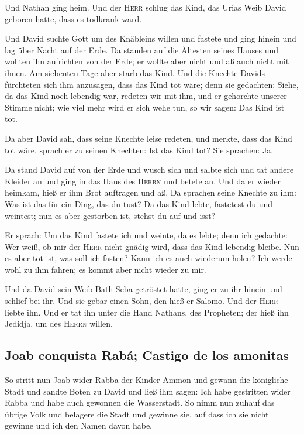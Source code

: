  Und Nathan ging heim. Und der \textsc{Herr} schlug das
Kind, das Urias Weib David geboren hatte, dass es todkrank ward.

 Und David suchte Gott um des Knäbleins willen und
fastete und ging hinein und lag über Nacht auf der Erde. 
Da standen auf die Ältesten seines Hauses und wollten ihn aufrichten von
der Erde; er wollte aber nicht und aß auch nicht mit ihnen.
 Am siebenten Tage aber starb das Kind. Und die Knechte
Davids fürchteten sich ihm anzusagen, dass das Kind tot wäre; denn sie
gedachten: Siehe, da das Kind noch lebendig war, redeten wir mit ihm,
und er gehorchte unserer Stimme nicht; wie viel mehr wird er sich wehe
tun, so wir sagen: Das Kind ist tot.

 Da aber David sah, dass seine Knechte leise redeten, und
merkte, dass das Kind tot wäre, sprach er zu seinen Knechten: Ist das
Kind tot? Sie sprachen: Ja.

 Da stand David auf von der Erde und wusch sich und
salbte sich und tat andere Kleider an und ging in das Haus des
\textsc{Herrn} und betete an. Und da er wieder heimkam, hieß er ihm Brot
auftragen und aß.  Da sprachen seine Knechte zu ihm: Was
ist das für ein Ding, das du tust? Da das Kind lebte, fastetest du und
weintest; nun es aber gestorben ist, stehst du auf und isst?

 Er sprach: Um das Kind fastete ich und weinte, da es
lebte; denn ich gedachte: Wer weiß, ob mir der \textsc{Herr} nicht
gnädig wird, dass das Kind lebendig bleibe.  Nun es aber
tot ist, was soll ich fasten? Kann ich es auch wiederum holen? Ich werde
wohl zu ihm fahren; es kommt aber nicht wieder zu mir.

 Und da David sein Weib Bath-Seba getröstet hatte, ging
er zu ihr hinein und schlief bei ihr. Und sie gebar einen Sohn, den hieß
er Salomo. Und der \textsc{Herr} liebte ihn.  Und er tat
ihn unter die Hand Nathans, des Propheten; der hieß ihn Jedidja, um des
\textsc{Herrn} willen.

\hypertarget{joab-conquista-rabuxe1-castigo-de-los-amonitas}{%
\subsection{Joab conquista Rabá; Castigo de los
amonitas}\label{joab-conquista-rabuxe1-castigo-de-los-amonitas}}

 So stritt nun Joab wider Rabba der Kinder Ammon und
gewann die königliche Stadt  und sandte Boten zu David
und ließ ihm sagen: Ich habe gestritten wider Rabba und habe auch
gewonnen die Wasserstadt.  So nimm nun zuhauf das übrige
Volk und belagere die Stadt und gewinne sie, auf dass ich sie nicht
gewinne und ich den Namen davon habe.

